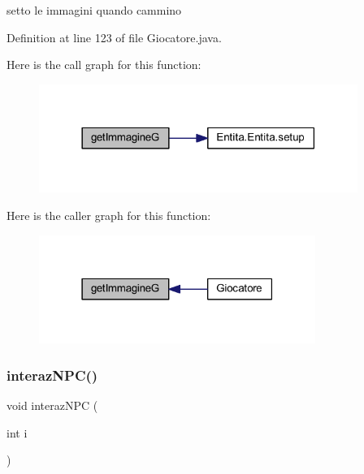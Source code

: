 setto le immagini quando cammino 



Definition at line 123 of file Giocatore.\+java.

Here is the call graph for this function\+:
\nopagebreak
\begin{figure}[H]
\begin{center}
\leavevmode
\includegraphics[width=294pt]{class_entita_1_1_giocatore_abac365540bed82b4025e8e845b779c72_cgraph}
\end{center}
\end{figure}
Here is the caller graph for this function\+:
\nopagebreak
\begin{figure}[H]
\begin{center}
\leavevmode
\includegraphics[width=255pt]{class_entita_1_1_giocatore_abac365540bed82b4025e8e845b779c72_icgraph}
\end{center}
\end{figure}
\mbox{\label{class_entita_1_1_giocatore_aaf1d3a52e79be598afe385c91a9f4d0c}} 
\subsubsection{\texorpdfstring{interaz\+N\+P\+C()}{interazNPC()}}
{\footnotesize\ttfamily void interaz\+N\+PC (\begin{DoxyParamCaption}\item[{int}]{i }\end{DoxyParamCaption})}




